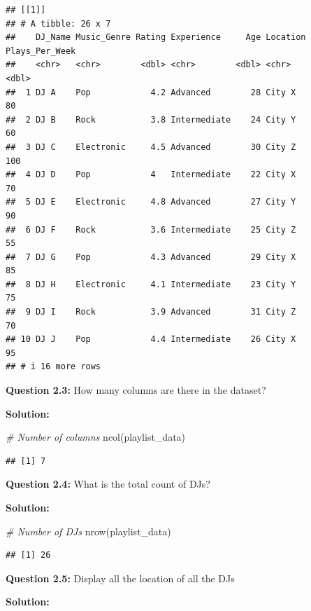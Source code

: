\documentclass[
]{article}
\newenvironment{Shaded}{\begin{snugshade}}{\end{snugshade}}
\newcommand{\CommentTok}[1]{\textcolor[rgb]{0.56,0.35,0.01}{\textit{#1}}}
\newcommand{\FunctionTok}[1]{\textcolor[rgb]{0.00,0.00,0.00}{#1}}
\newcommand{\NormalTok}[1]{#1}
\begin{document}
\begin{verbatim}
## [[1]]
## # A tibble: 26 x 7
##    DJ_Name Music_Genre Rating Experience     Age Location Plays_Per_Week
##    <chr>   <chr>        <dbl> <chr>        <dbl> <chr>             <dbl>
##  1 DJ A    Pop            4.2 Advanced        28 City X               80
##  2 DJ B    Rock           3.8 Intermediate    24 City Y               60
##  3 DJ C    Electronic     4.5 Advanced        30 City Z              100
##  4 DJ D    Pop            4   Intermediate    22 City X               70
##  5 DJ E    Electronic     4.8 Advanced        27 City Y               90
##  6 DJ F    Rock           3.6 Intermediate    25 City Z               55
##  7 DJ G    Pop            4.3 Advanced        29 City X               85
##  8 DJ H    Electronic     4.1 Intermediate    23 City Y               75
##  9 DJ I    Rock           3.9 Advanced        31 City Z               70
## 10 DJ J    Pop            4.4 Intermediate    26 City X               95
## # i 16 more rows
\end{verbatim}

\textbf{Question 2.3:} How many columns are there in the dataset?

\textbf{Solution:}

\begin{Shaded}
\begin{Highlighting}[]
\CommentTok{\# Number of columns}
\FunctionTok{ncol}\NormalTok{(playlist\_data)}
\end{Highlighting}
\end{Shaded}

\begin{verbatim}
## [1] 7
\end{verbatim}

\textbf{Question 2.4:} What is the total count of DJs?

\textbf{Solution:}

\begin{Shaded}
\begin{Highlighting}[]
\CommentTok{\# Number of DJs}
\FunctionTok{nrow}\NormalTok{(playlist\_data)}
\end{Highlighting}
\end{Shaded}

\begin{verbatim}
## [1] 26
\end{verbatim}

\textbf{Question 2.5:} Display all the location of all the DJs

\textbf{Solution:}
\end{document}
